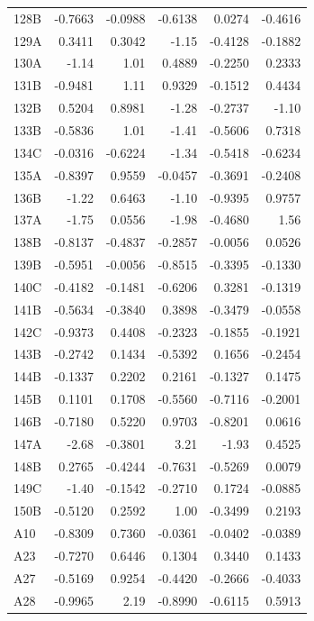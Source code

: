\begin{longtable}{lrrrrr}
  128B & -0.7663 & -0.0988 & -0.6138 & 0.0274 & -0.4616 \\
  129A & 0.3411 & 0.3042 & -1.15 & -0.4128 & -0.1882 \\
  130A & -1.14 & 1.01 & 0.4889 & -0.2250 & 0.2333 \\
  131B & -0.9481 & 1.11 & 0.9329 & -0.1512 & 0.4434 \\
  132B & 0.5204 & 0.8981 & -1.28 & -0.2737 & -1.10 \\
  133B & -0.5836 & 1.01 & -1.41 & -0.5606 & 0.7318 \\
  134C & -0.0316 & -0.6224 & -1.34 & -0.5418 & -0.6234 \\
  135A & -0.8397 & 0.9559 & -0.0457 & -0.3691 & -0.2408 \\
  136B & -1.22 & 0.6463 & -1.10 & -0.9395 & 0.9757 \\
  137A & -1.75 & 0.0556 & -1.98 & -0.4680 & 1.56 \\
  138B & -0.8137 & -0.4837 & -0.2857 & -0.0056 & 0.0526 \\
  139B & -0.5951 & -0.0056 & -0.8515 & -0.3395 & -0.1330 \\
  140C & -0.4182 & -0.1481 & -0.6206 & 0.3281 & -0.1319 \\
  141B & -0.5634 & -0.3840 & 0.3898 & -0.3479 & -0.0558 \\
  142C & -0.9373 & 0.4408 & -0.2323 & -0.1855 & -0.1921 \\
  143B & -0.2742 & 0.1434 & -0.5392 & 0.1656 & -0.2454 \\
  144B & -0.1337 & 0.2202 & 0.2161 & -0.1327 & 0.1475 \\
  145B & 0.1101 & 0.1708 & -0.5560 & -0.7116 & -0.2001 \\
  146B & -0.7180 & 0.5220 & 0.9703 & -0.8201 & 0.0616 \\
  147A & -2.68 & -0.3801 & 3.21 & -1.93 & 0.4525 \\
  148B & 0.2765 & -0.4244 & -0.7631 & -0.5269 & 0.0079 \\
  149C & -1.40 & -0.1542 & -0.2710 & 0.1724 & -0.0885 \\
  150B & -0.5120 & 0.2592 & 1.00 & -0.3499 & 0.2193 \\
  A10 & -0.8309 & 0.7360 & -0.0361 & -0.0402 & -0.0389 \\
  A23 & -0.7270 & 0.6446 & 0.1304 & 0.3440 & 0.1433 \\
  A27 & -0.5169 & 0.9254 & -0.4420 & -0.2666 & -0.4033 \\
  A28 & -0.9965 & 2.19 & -0.8990 & -0.6115 & 0.5913 \\

\end{longtable}
